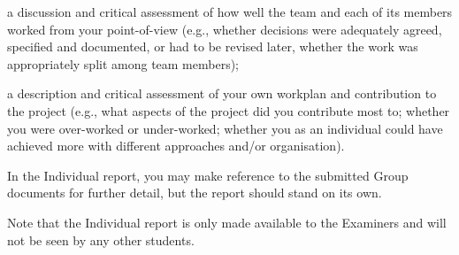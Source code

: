 a discussion and critical assessment of how well the team and each of its
members worked from your point-of-view (e.g., whether decisions were
adequately agreed, specified and documented, or had to be revised later,
whether the work was appropriately split among team members);

a description and critical assessment of your own workplan and contribution
to the project (e.g., what aspects of the project did you contribute most
to; whether you were over-worked or under-worked; whether you as an
individual could have achieved more with different approaches and/or
organisation).

In the Individual report, you may make reference to the submitted Group
documents for further detail, but the report should stand on its own.

Note that the Individual report is only made available to the Examiners and will
not be seen by any other students.



